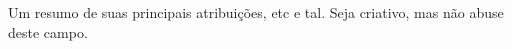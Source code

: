 

\begin{cvparagraph}

Um resumo de suas principais atribuições, etc e tal. Seja criativo, mas não abuse deste campo.
\end{cvparagraph}

